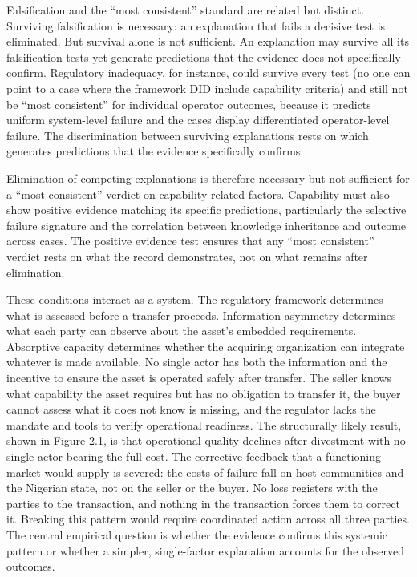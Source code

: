 Falsification and the ``most consistent'' standard are related but
distinct. Surviving falsification is necessary: an explanation that
fails a decisive test is eliminated. But survival alone is not
sufficient. An explanation may survive all its falsification tests yet
generate predictions that the evidence does not specifically confirm.
Regulatory inadequacy, for instance, could survive every test (no one
can point to a case where the framework DID include capability criteria)
and still not be ``most consistent'' for individual operator outcomes,
because it predicts uniform system-level failure and the cases display
differentiated operator-level failure. The discrimination between
surviving explanations rests on which generates predictions that the
evidence specifically confirms.

Elimination of competing explanations is therefore necessary but not
sufficient for a ``most consistent'' verdict on capability-related
factors. Capability must also show positive evidence matching its
specific predictions, particularly the selective failure signature and
the correlation between knowledge inheritance and outcome across cases.
The positive evidence test ensures that any ``most consistent'' verdict
rests on what the record demonstrates, not on what remains after
elimination.

These conditions interact as a system. The regulatory framework
determines what is assessed before a transfer proceeds. Information
asymmetry determines what each party can observe about the asset's
embedded requirements. Absorptive capacity determines whether the
acquiring organization can integrate whatever is made available. No
single actor has both the information and the incentive to ensure the
asset is operated safely after transfer. The seller knows what
capability the asset requires but has no obligation to transfer it, the
buyer cannot assess what it does not know is missing, and the regulator
lacks the mandate and tools to verify operational readiness. The
structurally likely result, shown in Figure 2.1, is that operational
quality declines after divestment with no single actor bearing the full
cost. The corrective feedback that a functioning market would supply is
severed: the costs of failure fall on host communities and the Nigerian
state, not on the seller or the buyer. No loss registers with the
parties to the transaction, and nothing in the transaction forces them
to correct it. Breaking this pattern would require coordinated action
across all three parties. The central empirical question is whether the
evidence confirms this systemic pattern or whether a simpler,
single-factor explanation accounts for the observed outcomes.

